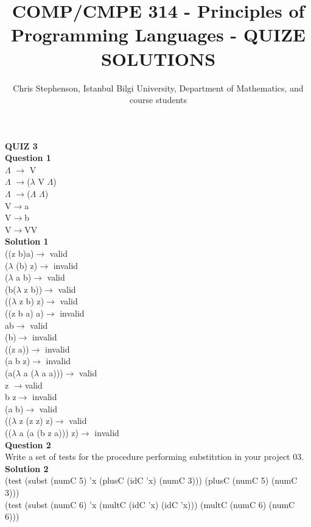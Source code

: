 \documentclass{article}
\begin{document}
\title{COMP/CMPE 314 - Principles of Programming Languages - QUIZE SOLUTIONS}
\author{Chris Stephenson, Istanbul Bilgi University, Department of Mathematics, and course students}
\maketitle
\textbf{QUIZ 3}\\ 
\textbf{Question 1}\\
$\Lambda$ $\rightarrow$ V\\
$\Lambda$ $\rightarrow$($\lambda$ V $\Lambda$)\\
$\Lambda$ $\rightarrow$($\Lambda$ $\Lambda$)\\
V$\rightarrow$a\\
V$\rightarrow$b\\
V$\rightarrow$VV\\
\textbf{Solution 1}\\
((z b)a)$\rightarrow$ valid\\
($\lambda$ (b) z)$\rightarrow$ invalid\\
($\lambda$ a b)$\rightarrow$ valid\\
(b($\lambda$ z b))$\rightarrow$ valid\\
(($\lambda$ z b) z)$\rightarrow$ valid\\
((z b a) a)$\rightarrow$ invalid\\
ab$\rightarrow$ valid\\
(b)$\rightarrow$ invalid\\
((z a))$\rightarrow$ invalid\\
(a b z)$\rightarrow$ invalid\\
(a($\lambda$ a ($\lambda$ a a)))$\rightarrow$ valid\\
z $\rightarrow$valid\\
b z$\rightarrow$ invalid\\
(a b)$\rightarrow$ valid\\
(($\lambda$ z (z z) z)$\rightarrow$ valid\\
(($\lambda$ a (a (b z a))) z)$\rightarrow$ invalid\\
\textbf{Question 2}\\
Write a set of tests for the procedure performing substitıtion in your project 03.\\
\textbf{Solution 2} \\
(test (subst (numC 5) 'x (plusC (idC 'x) (numC 3))) (plusC (numC 5) (numC 3)))\\
(test (subst (numC 6) 'x (multC (idC 'x) (idC 'x))) (multC (numC 6) (numC 6)))\\
\end{document}
